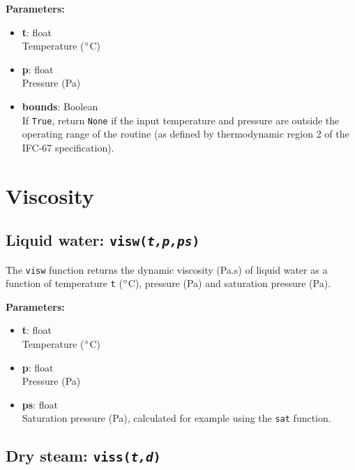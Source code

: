 \textbf{Parameters:}
\begin{itemize}
\item \textbf{t}: float\\
  Temperature ($\degree$C)
\item \textbf{p}: float\\
  Pressure (Pa)
\item \textbf{bounds}: Boolean\\
  If \texttt{True}, return \texttt{None} if the input temperature and pressure are outside the operating range of the routine (as defined by thermodynamic region 2 of the IFC-67 specification).
\end{itemize}

\section{Viscosity}

\begin{snugshade}
\subsection{Liquid water: \texttt{visw(\emph{t,p,ps})}}
\end{snugshade}
\label{sec:t2thermo:visw}

The \texttt{visw} function returns the dynamic viscosity (Pa.s) of liquid water as a function of temperature \texttt{t} ($\degree$C), pressure (Pa) and saturation pressure (Pa).

\textbf{Parameters:}
\begin{itemize}
\item \textbf{t}: float\\
  Temperature ($\degree$C)
\item \textbf{p}: float\\
  Pressure (Pa)
\item \textbf{ps}: float\\
  Saturation pressure (Pa), calculated for example using the \texttt{sat} function.
\end{itemize}

\begin{snugshade}
\subsection{Dry steam: \texttt{viss(\emph{t,d})}}
\end{snugshade}
\label{sec:t2thermo:viss}

